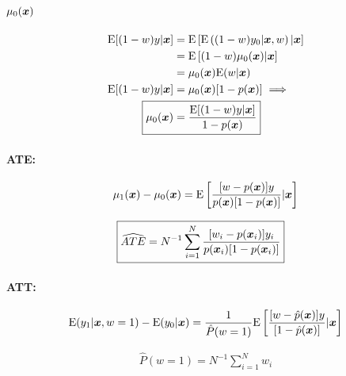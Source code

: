 \documentclass[11pt, oneside, a4paper, article]{article}
\numberwithin{equation}{section}
\begin{document}
\begin{description}
\paragraph{$\mu_{0}( \boldsymbol{x} )$}

\vspace{-1 em}
\begin{align*}
	\E[ (1-w) y | \xvec ] &= \E\left[  \E \left( (1 - w) y_{0} | \xvec, w  \right) | \xvec \right]
\\ &=
\E \left[ (1 - w) \mu_{0}(\xvec) | \xvec \right]
\\ &=
\mu_{0}(\xvec) \E(w | \xvec )
\\ 
\E[ (1-w) y | \xvec ] 
&=
\mu_{0}(\xvec) [1 - p(\xvec)] \implies
\\ 
\Aboxed{
\mu_{0}(\xvec)
&=
\frac{\E[ (1-w) y | \xvec ] }{1 - p( \xvec ) } }
\end{align*}

\paragraph{ATE:}

\begin{align*}
\mu_{1}(\boldsymbol{x}) - \mu_{0}(\boldsymbol{x}) =
\text{E}\left[ 
\frac{[w - p(\boldsymbol{x})] y}{p(\boldsymbol{x}) [1 - p(\boldsymbol{x})]}
| \boldsymbol{x}
\right]
\end{align*}

\begin{align*}
\Aboxed{
\widehat{ATE} =
N^{-1} \sum_{i=1}^{N}
\frac{[ w_{i} - p(\xvec_{i} ) ] y_{i} }{ p( \xvec_{i} ) [1 - p( \xvec_{i} ) ] }
}
\end{align*}

\paragraph{ATT:}

\begin{align*}
\text{E}( y_{1} | \boldsymbol{x}, w=1) - \text{E}(y_{0} | \boldsymbol{x}) =
\frac{1}{\hat{P}(w=1)}
\text{E}\left[ 
\frac{[w - \hat{p}(\boldsymbol{x})] y}{[ 1 - \hat{p}(\boldsymbol{x}) ]}
| \boldsymbol{x}
\right]
\end{align*}

\vspace{-1 em}
\begin{align*}
	\hat{P} (w = 1) = N^{-1} \sum_{i=1}^{N} w_{i}
\end{align*}


\end{description}
\end{document}
